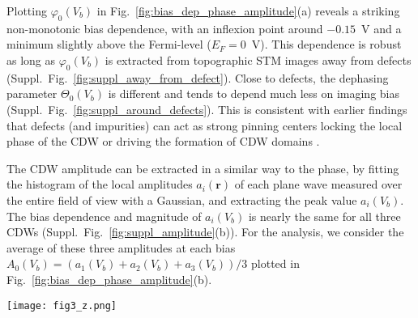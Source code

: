 \documentclass[aps,prl,twocolumn,superscriptaddress]{revtex4-2}
\renewcommand{\v}[1]{\ensuremath{\mathbf{#1}}}
\def \SF[#1]{Suppl.~Fig.~\ref{#1}}
\begin{document}
Plotting $\varphi_0(V_b)$ in Fig.~\ref{fig:bias_dep_phase_amplitude}(a) reveals a striking non-monotonic bias dependence, with an inflexion point around $-0.15$~V and a minimum slightly above the Fermi-level ($E_F=0$~V). This dependence is robust as long as $\varphi_0(V_b)$ is extracted from topographic STM images away from defects (\SF[fig:suppl_away_from_defect]). Close to defects, the dephasing parameter $\Theta_0(V_b)$ is different and tends to depend much less on imaging bias (\SF[fig:suppl_around_defects]). This is consistent with earlier findings that defects (and impurities) can act as strong pinning centers \cite{Fukuyama1976,Fukuyama1978} locking the local phase of the CDW or driving the formation of CDW domains \cite{Hildebrand2016,Novello2017}. 

The CDW amplitude can be extracted in a similar way to the phase, by fitting the histogram of the local amplitudes $a_i(\v{r})$ of each plane wave measured over the entire field of view with a Gaussian, and extracting the peak value $a_i(V_b)$. The bias dependence and magnitude of $a_i(V_b)$ is nearly the same for all three CDWs (\SF[fig:suppl_amplitude](b)). For the analysis, we consider the average of these three amplitudes at each bias $A_0(V_b)=(a_1(V_b)+a_2(V_b)+a_3(V_b))/3$ plotted in Fig.~\ref{fig:bias_dep_phase_amplitude}(b).

\begin{figure*}[htp]
\texttt{[image: fig3\_z.png]}%
\caption{\label{fig:two_gap_model} \textbf{One-dimensional model description of the bias dependent phase of the CDW.} (a)-(c) There is a single CM and the corresponding gap is centred at the Fermi level.  (d)-(f) There are two CMs with two gaps which are centered at different energy (one at the Fermi-level and one below). There is no real-space phase difference between the CMs. (g)-(i) The same as (d)-(f) except that the there is a 120$^{\circ}$ (2$\pi$/3) phase difference -one atom shift- between the two CMs. In all the three cases the first column shows the spatial and energy dependent CDW LDOS maps. Second column: corresponding simulated topographic traces at selected biases. To clearly see the evolution of the phase and the amplitude the curves are vertically offset in panel (b)(e) and (h) such that they all oscillate around the same value. Third column: bias dependence of the phase (left red axis) and DOS (spatially integrated LDOS from the first column, right blue axis).  }
\end{figure*}
\end{document}
